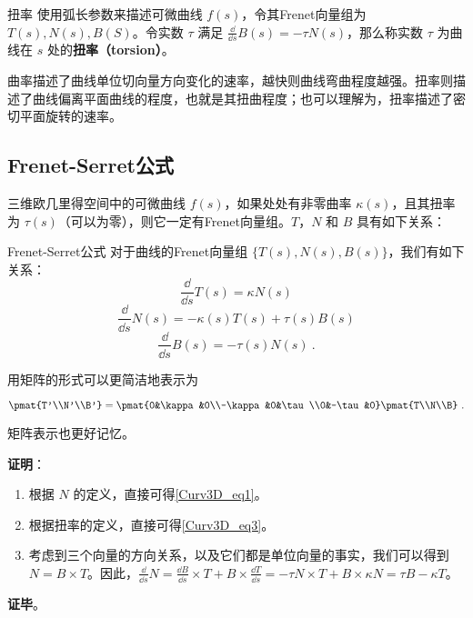 \begin{definition}{扭率}
使用弧长参数来描述可微曲线 $f(s)$，令其Frenet向量组为 $T(s), N(s), B(S)$。令实数 $\tau$ 满足 $\frac{\dd}{\dd s}B(s)=-\tau N(s)$，那么称实数 $\tau$ 为曲线在 $s$ 处的\textbf{扭率（torsion）}。
\end{definition}

曲率描述了曲线单位切向量方向变化的速率，越快则曲线弯曲程度越强。扭率则描述了曲线偏离平面曲线的程度，也就是其扭曲程度；也可以理解为，扭率描述了密切平面旋转的速率。

\subsection{Frenet-Serret公式}

三维欧几里得空间中的可微曲线 $f(s)$，如果处处有非零曲率 $\kappa(s)$，且其扭率为 $\tau(s)$（可以为零），则它一定有Frenet向量组。$T$，$N$ 和 $B$ 具有如下关系：

\begin{theorem}{Frenet-Serret公式}
对于曲线的Frenet向量组 $\{T(s), N(s), B(s)\}$，我们有如下关系：
\begin{equation}\label{Curv3D_eq1}
\frac{\dd}{\dd s}T(s)=\kappa N(s)
\end{equation}
\begin{equation}\label{Curv3D_eq2}
\frac{\dd}{\dd s}N(s)=-\kappa(s) T(s)+\tau(s) B(s)
\end{equation}
\begin{equation}\label{Curv3D_eq3}
\frac{\dd}{\dd s}B(s)=-\tau(s) N(s)~.
\end{equation}

用矩阵的形式可以更简洁地表示为

\begin{equation}
\pmat{T'\\N'\\B'}=\pmat{0&\kappa&0\\-\kappa&0&\tau\\0&-\tau&0}\pmat{T\\N\\B}~.
\end{equation}

矩阵表示也更好记忆。
\end{theorem}

\textbf{证明}：

\begin{enumerate}
\item 根据 $N$ 的定义，直接可得\autoref{Curv3D_eq1}。
\item 根据扭率的定义，直接可得\autoref{Curv3D_eq3}。
\item 考虑到三个向量的方向关系，以及它们都是单位向量的事实，我们可以得到 $N=B\times T$。因此，$\frac{\dd}{\dd s}N=\frac{\dd B}{\dd s}\times T+B\times\frac{\dd T}{\dd s}=-\tau N\times T+B\times\kappa N=\tau B-\kappa T$。
\end{enumerate}

\textbf{证毕}。





